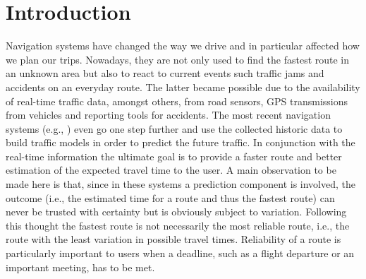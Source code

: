 \vspace{-0.4cm}
\section{Introduction}

Navigation systems have changed the way we drive and in particular affected how
we plan our trips. Nowadays, they are not only used to find the fastest
route in an unknown area but also to react to current events such traffic jams
and accidents on an everyday route. The latter became possible due to the
availability of real-time traffic data, amongst others, from road sensors, GPS
transmissions from vehicles and reporting tools for accidents. The most recent
navigation systems (e.g., \cite{Pan13}) even go one step further and
use the collected historic data to build traffic models in order to predict the future traffic. In
conjunction with the real-time information the ultimate goal is to provide a faster
route and better estimation of the expected travel time to the user. A
main observation to be made here is that, since in these systems a prediction
component is involved, the outcome (i.e., the estimated time for a route and
thus the fastest route) can never be trusted with certainty but is
obviously subject to variation. Following this thought the fastest route is not
necessarily the most reliable route, i.e., the route with the least variation in
possible travel times. Reliability of a route is particularly important to users
when a deadline, such as a flight departure or an important meeting, has to be
met. 

